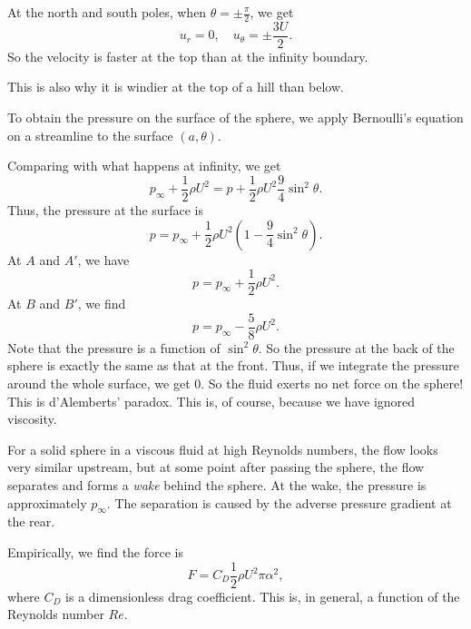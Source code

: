 \documentclass[a4paper]{article}
\begin{document}
\begin{eg}
  At the north and south poles, when $\theta = \pm \frac{\pi}{2}$, we get
  \[
    u_r = 0,\quad u_\theta = \pm \frac{3U}{2}.
  \]
  So the velocity is faster at the top than at the infinity boundary.
  \begin{center}
  \end{center}
  This is also why it is windier at the top of a hill than below.

  To obtain the pressure on the surface of the sphere, we apply Bernoulli's equation on a streamline to the surface $(a, \theta)$.

  Comparing with what happens at infinity, we get
  \[
    p_\infty + \frac{1}{2} \rho U^2 = p + \frac{1}{2}\rho U^2 \frac{9}{4} \sin^2 \theta.
  \]
  Thus, the pressure at the surface is
  \[
    p = p_\infty + \frac{1}{2}\rho U^2 \left(1 - \frac{9}{4} \sin^2 \theta\right).
  \]
  At $A$ and $A'$, we have
  \[
    p = p_\infty + \frac{1}{2}\rho U^2.
  \]
  At $B$ and $B'$, we find
  \[
    p = p_\infty - \frac{5}{8} \rho U^2.
  \]
  Note that the pressure is a function of $\sin^2 \theta$. So the pressure at the back of the sphere is exactly the same as that at the front. Thus, if we integrate the pressure around the whole surface, we get $0$. So the fluid exerts no net force on the sphere! This is d'Alemberts' paradox. This is, of course, because we have ignored viscosity.

  For a solid sphere in a viscous fluid at high Reynolds numbers, the flow looks very similar upstream, but at some point after passing the sphere, the flow separates and forms a \emph{wake} behind the sphere. At the wake, the pressure is approximately $p_\infty$. The separation is caused by the adverse pressure gradient at the rear.

  Empirically, we find the force is
  \[
    F = C_D \frac{1}{2} \rho U^2\pi \alpha^2,
  \]
  where $C_D$ is a dimensionless drag coefficient. This is, in general, a function of the Reynolds number $Re$.
\end{eg}
\end{document}
